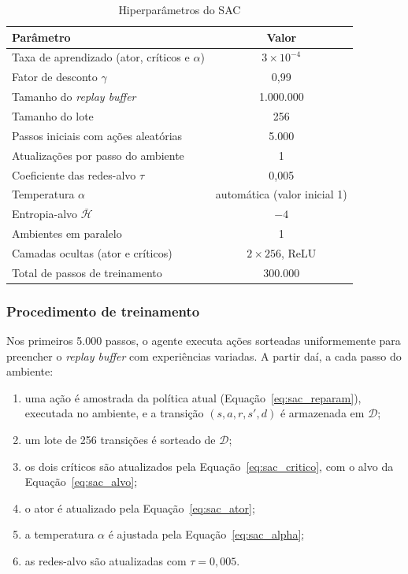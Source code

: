 \begin{table}[htb]
    \centering
    \caption{Hiperparâmetros do SAC}
    \label{tab:sac}
    \begin{tabular}{lc}
        \hline
        Parâmetro & Valor \\
        \hline
        Taxa de aprendizado (ator, críticos e $\alpha$) & $3 \times 10^{-4}$ \\
        Fator de desconto $\gamma$                         & 0,99 \\
        Tamanho do \textit{replay buffer}                  & 1.000.000 \\
        Tamanho do lote                                    & 256 \\
        Passos iniciais com ações aleatórias               & 5.000 \\
        Atualizações por passo do ambiente                 & 1 \\
        Coeficiente das redes-alvo $\tau$                  & 0,005 \\
        Temperatura $\alpha$                               & automática (valor inicial 1) \\
        Entropia-alvo $\bar{\mathcal{H}}$                  & $-4$ \\
        Ambientes em paralelo                              & 1 \\
        Camadas ocultas (ator e críticos)                  & $2 \times 256$, ReLU \\
        Total de passos de treinamento                     & 300.000 \\
        \hline
    \end{tabular}
\end{table}

\subsubsection{Procedimento de treinamento}

Nos primeiros 5.000 passos, o agente executa ações sorteadas uniformemente para preencher o \textit{replay buffer} com experiências variadas. A partir daí, a cada passo do ambiente:

\begin{enumerate}
    \item uma ação é amostrada da política atual (Equação~\ref{eq:sac_reparam}), executada no ambiente, e a transição $(s, a, r, s', d)$ é armazenada em $\mathcal{D}$;
    \item um lote de 256 transições é sorteado de $\mathcal{D}$;
    \item os dois críticos são atualizados pela Equação~\ref{eq:sac_critico}, com o alvo da Equação~\ref{eq:sac_alvo};
    \item o ator é atualizado pela Equação~\ref{eq:sac_ator};
    \item a temperatura $\alpha$ é ajustada pela Equação~\ref{eq:sac_alpha};
    \item as redes-alvo são atualizadas com $\tau = 0{,}005$.
\end{enumerate}

